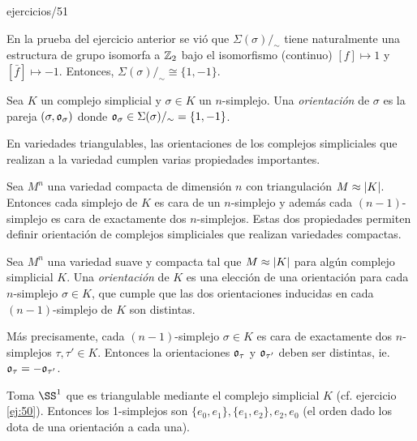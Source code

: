\documentclass[../../topologia_algebraica]{subfiles}
\begin{document}
{ejercicios/51} %

En la prueba del ejercicio anterior se vi\'o que $\Sigma(\sigma)/_{\sim}$ tiene naturalmente
una estructura de grupo isomorfa a $\mathbb{Z}_{2}$ bajo el isomorfismo (continuo) $[f]\mapsto1$ y
$[\bar{f}]\mapsto-1$. Entonces, $\Sigma(\sigma)/_{\sim}\cong\{1,-1\}$.

\begin{defin}
  Sea $K$ un complejo simplicial y $\sigma\in K$ un $n$-simplejo. Una \emph{orientaci\'on} de
  $\sigma$ es la pareja $(\sigma,\mathfrak{o}_{\sigma})$ donde $\mathfrak{o}_{\sigma}\in\Sigma(\sigma)/_{\sim}=\{1,-1\}$.
\end{defin}

En variedades triangulables, las orientaciones de los complejos simpliciales que realizan a la variedad
cumplen varias propiedades importantes.

Sea $M^n$ una variedad compacta de dimensi\'on $n$ con triangulaci\'on $M\approx\left| K \right|$. Entonces
cada simplejo de $K$ es cara de un $n$-simplejo y adem\'as cada $(n-1)$-simplejo es cara de
exactamente dos $n$-simplejos. Estas dos propiedades permiten definir orientaci\'on de complejos
simpliciales que realizan variedades compactas.

\begin{defin}
  Sea $M^n$ una variedad suave y compacta tal que $M\approx\left| K \right|$ para alg\'un complejo
  simplicial $K$. Una \emph{orientaci\'on} de $K$ es una elecci\'on de una orientaci\'on
  para cada $n$-simplejo $\sigma\in K$, que cumple que las dos orientaciones inducidas en cada
  $(n-1)$-simplejo de $K$ son distintas.
\end{defin}

M\'as precisamente, cada $(n-1)$-simplejo $\sigma\in K$ es cara de exactamente dos $n$-simplejos
$\tau,\tau'\in K$. Entonces la orientaciones $\mathfrak{o}_{\tau}$ y $\mathfrak{o}_{\tau'}$ deben ser distintas, ie.
$\mathfrak{o}_{\tau}=-\mathfrak{o}_{\tau'}$.

\begin{figure}[h!]%
  \centering
\end{figure}%

\begin{ejemplo}
  Toma $\SS^1$ que es triangulable mediante el complejo simplicial $K$ (cf. ejercicio \ref{ej:50}).
  Entonces los 1-simplejos son $\{e_0,e_1\},\{e_1,e_2\},{e_2,e_0}$ (el orden dado los dota de una
  orientaci\'on a cada una).
\end{ejemplo}
\end{document}

